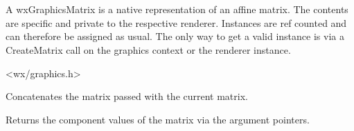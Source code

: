 
\section{}\label{wxgraphicsmatrix}

A wxGraphicsMatrix is a native representation of an affine matrix. The contents are specific and private to the respective renderer. Instances are ref counted and can therefore be assigned as usual. The only way to get a valid instance is via a CreateMatrix call on the graphics context or the renderer instance.




<wx/graphics.h>




\label{wxgraphicsmatrixconcat}


Concatenates the matrix passed with the current matrix.



\label{wxgraphicsmatrixget}


Returns the component values of the matrix via the argument pointers.

\label{wxgraphicsmatrixgetnativematrix}

